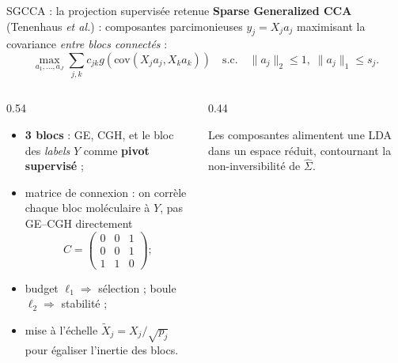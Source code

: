 \documentclass[aspectratio=169, 10pt]{beamer}
\begin{document}
\begin{frame}{SGCCA : la projection supervisée retenue}
  \textbf{Sparse Generalized CCA} (Tenenhaus \textit{et al.}) : composantes parcimonieuses $y_j = X_j a_j$ maximisant la covariance \textit{entre blocs connectés} :
  \[
    \max_{a_1, \dots, a_J} \sum_{j,k} c_{jk} g\left(\text{cov}(X_j a_j, X_k a_k)\right) \quad \text{s.c.} \quad \|a_j\|_2 \le 1, \; \|a_j\|_1 \le s_j.
  \]

  \begin{columns}[c]
    \begin{column}{0.54\textwidth}
      \begin{itemize}
        \item \textbf{3 blocs} : GE, CGH, et le bloc des \textit{labels} $Y$ comme \textbf{pivot supervisé} ;
        \item matrice de connexion : on corrèle chaque bloc moléculaire à $Y$, pas GE–CGH directement
              \[
                C = \begin{pmatrix} 0 & 0 & 1 \\ 0 & 0 & 1 \\ 1 & 1 & 0 \end{pmatrix} ;
              \]
        \item budget $\ell_1 \Rightarrow$ sélection ; boule $\ell_2 \Rightarrow$ stabilité ;
        \item mise à l’échelle $\tilde{X}_j = X_j / \sqrt{p_j}$ pour égaliser l’inertie des blocs.
      \end{itemize}
    \end{column}

    \begin{column}{0.44\textwidth}
      \centering
      \vskip 4pt
        {\footnotesize Les composantes alimentent une LDA dans un espace réduit, contournant la non-inversibilité de $\hat{\Sigma}$.}
    \end{column}
  \end{columns}
\end{frame}
\end{document}
